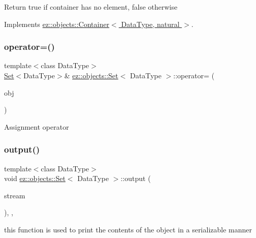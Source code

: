 Return true if container has no element, false otherwise 

Implements \hyperlink{classez_1_1objects_1_1Container_a205eb4f8a4fe967d425fdf04e5db5f93}{ez\+::objects\+::\+Container$<$ Data\+Type, natural $>$}.

\mbox{\label{classez_1_1objects_1_1Set_a34b861364e501b39bc619daf9b4bc830}} 
\subsubsection{\texorpdfstring{operator=()}{operator=()}}
{\footnotesize\ttfamily template$<$class Data\+Type$>$ \\
\hyperlink{classez_1_1objects_1_1Set}{Set}$<$Data\+Type$>$\& \hyperlink{classez_1_1objects_1_1Set}{ez\+::objects\+::\+Set}$<$ Data\+Type $>$\+::operator= (\begin{DoxyParamCaption}\item[{const \hyperlink{classez_1_1objects_1_1Set}{Set}$<$ Data\+Type $>$ \&}]{obj }\end{DoxyParamCaption})\hspace{0.3cm}{\ttfamily [inline]}}

Assignment operator \mbox{\label{classez_1_1objects_1_1Set_a1a98246f459de08368b425eae3720873}} 
\subsubsection{\texorpdfstring{output()}{output()}}
{\footnotesize\ttfamily template$<$class Data\+Type$>$ \\
void \hyperlink{classez_1_1objects_1_1Set}{ez\+::objects\+::\+Set}$<$ Data\+Type $>$\+::output (\begin{DoxyParamCaption}\item[{std\+::ostream \&}]{stream }\end{DoxyParamCaption})\hspace{0.3cm}{\ttfamily [inline]}, {\ttfamily [override]}, {\ttfamily [virtual]}}

this function is used to print the contents of the object in a serializable manner 

